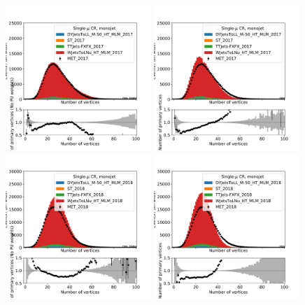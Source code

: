 \begin{figure}[ht!]
  \begin{center}
    \includegraphics[width=0.49\textwidth]{fig/pileup/cr_1m_j_npv_nopu_2017.pdf}
    \includegraphics[width=0.49\textwidth]{fig/pileup/cr_1m_j_npv_2017.pdf}
    \includegraphics[width=0.49\textwidth]{fig/pileup/cr_1m_j_npv_nopu_2018.pdf}
    \includegraphics[width=0.49\textwidth]{fig/pileup/cr_1m_j_npv_2018.pdf}

\end{center}
\end{figure}
